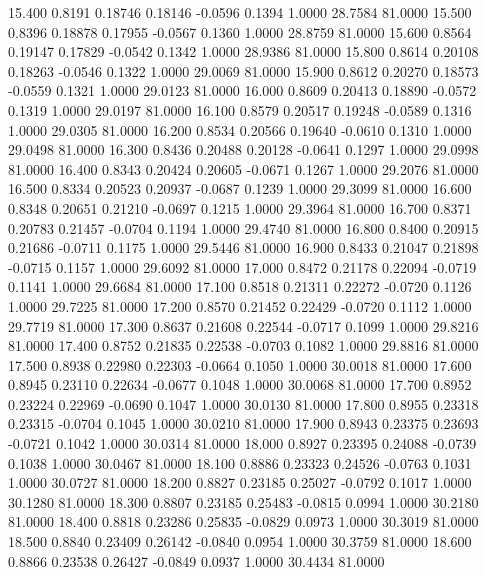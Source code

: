   15.400   0.8191   0.18746   0.18146  -0.0596   0.1394   1.0000  28.7584  81.0000
  15.500   0.8396   0.18878   0.17955  -0.0567   0.1360   1.0000  28.8759  81.0000
  15.600   0.8564   0.19147   0.17829  -0.0542   0.1342   1.0000  28.9386  81.0000
  15.800   0.8614   0.20108   0.18263  -0.0546   0.1322   1.0000  29.0069  81.0000
  15.900   0.8612   0.20270   0.18573  -0.0559   0.1321   1.0000  29.0123  81.0000
  16.000   0.8609   0.20413   0.18890  -0.0572   0.1319   1.0000  29.0197  81.0000
  16.100   0.8579   0.20517   0.19248  -0.0589   0.1316   1.0000  29.0305  81.0000
  16.200   0.8534   0.20566   0.19640  -0.0610   0.1310   1.0000  29.0498  81.0000
  16.300   0.8436   0.20488   0.20128  -0.0641   0.1297   1.0000  29.0998  81.0000
  16.400   0.8343   0.20424   0.20605  -0.0671   0.1267   1.0000  29.2076  81.0000
  16.500   0.8334   0.20523   0.20937  -0.0687   0.1239   1.0000  29.3099  81.0000
  16.600   0.8348   0.20651   0.21210  -0.0697   0.1215   1.0000  29.3964  81.0000
  16.700   0.8371   0.20783   0.21457  -0.0704   0.1194   1.0000  29.4740  81.0000
  16.800   0.8400   0.20915   0.21686  -0.0711   0.1175   1.0000  29.5446  81.0000
  16.900   0.8433   0.21047   0.21898  -0.0715   0.1157   1.0000  29.6092  81.0000
  17.000   0.8472   0.21178   0.22094  -0.0719   0.1141   1.0000  29.6684  81.0000
  17.100   0.8518   0.21311   0.22272  -0.0720   0.1126   1.0000  29.7225  81.0000
  17.200   0.8570   0.21452   0.22429  -0.0720   0.1112   1.0000  29.7719  81.0000
  17.300   0.8637   0.21608   0.22544  -0.0717   0.1099   1.0000  29.8216  81.0000
  17.400   0.8752   0.21835   0.22538  -0.0703   0.1082   1.0000  29.8816  81.0000
  17.500   0.8938   0.22980   0.22303  -0.0664   0.1050   1.0000  30.0018  81.0000
  17.600   0.8945   0.23110   0.22634  -0.0677   0.1048   1.0000  30.0068  81.0000
  17.700   0.8952   0.23224   0.22969  -0.0690   0.1047   1.0000  30.0130  81.0000
  17.800   0.8955   0.23318   0.23315  -0.0704   0.1045   1.0000  30.0210  81.0000
  17.900   0.8943   0.23375   0.23693  -0.0721   0.1042   1.0000  30.0314  81.0000
  18.000   0.8927   0.23395   0.24088  -0.0739   0.1038   1.0000  30.0467  81.0000
  18.100   0.8886   0.23323   0.24526  -0.0763   0.1031   1.0000  30.0727  81.0000
  18.200   0.8827   0.23185   0.25027  -0.0792   0.1017   1.0000  30.1280  81.0000
  18.300   0.8807   0.23185   0.25483  -0.0815   0.0994   1.0000  30.2180  81.0000
  18.400   0.8818   0.23286   0.25835  -0.0829   0.0973   1.0000  30.3019  81.0000
  18.500   0.8840   0.23409   0.26142  -0.0840   0.0954   1.0000  30.3759  81.0000
  18.600   0.8866   0.23538   0.26427  -0.0849   0.0937   1.0000  30.4434  81.0000
